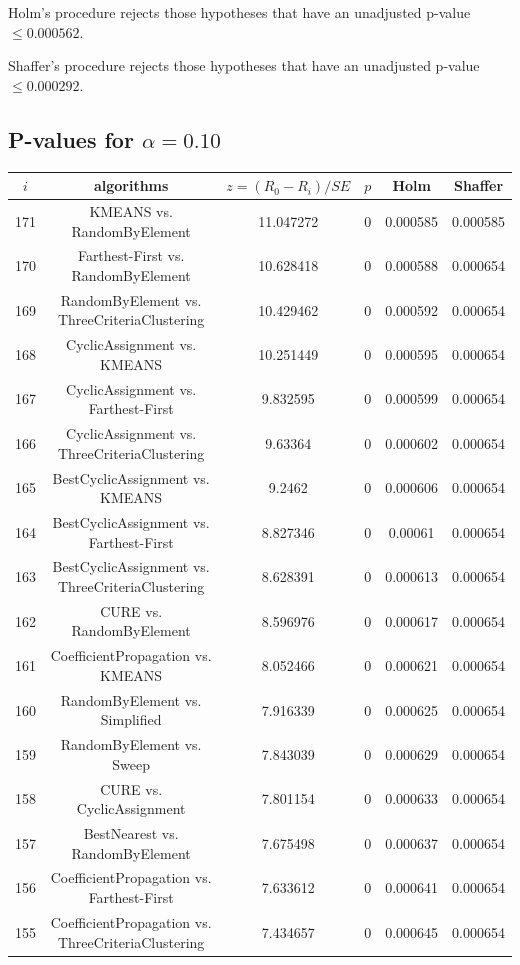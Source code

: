 \documentclass[a4paper,10pt]{article}
\begin{document}
\begin{landscape}
Holm's procedure rejects those hypotheses that have an unadjusted p-value $\le0.000562$.

Shaffer's procedure rejects those hypotheses that have an unadjusted p-value $\le0.000292$.

\pagebreak

\subsection{P-values for $\alpha=0.10$}

\begin{table}[!htp]
\centering\scriptsize
\begin{tabular}{cccccc}
$i$&algorithms&$z=(R_0 - R_i)/SE$&$p$&Holm&Shaffer\\
\hline171&KMEANS vs. RandomByElement&11.047272&0&0.000585&0.000585\\
170&Farthest-First vs. RandomByElement&10.628418&0&0.000588&0.000654\\
169&RandomByElement vs. ThreeCriteriaClustering&10.429462&0&0.000592&0.000654\\
168&CyclicAssignment vs. KMEANS&10.251449&0&0.000595&0.000654\\
167&CyclicAssignment vs. Farthest-First&9.832595&0&0.000599&0.000654\\
166&CyclicAssignment vs. ThreeCriteriaClustering&9.63364&0&0.000602&0.000654\\
165&BestCyclicAssignment vs. KMEANS&9.2462&0&0.000606&0.000654\\
164&BestCyclicAssignment vs. Farthest-First&8.827346&0&0.00061&0.000654\\
163&BestCyclicAssignment vs. ThreeCriteriaClustering&8.628391&0&0.000613&0.000654\\
162&CURE vs. RandomByElement&8.596976&0&0.000617&0.000654\\
161&CoefficientPropagation vs. KMEANS&8.052466&0&0.000621&0.000654\\
160&RandomByElement vs. Simplified&7.916339&0&0.000625&0.000654\\
159&RandomByElement vs. Sweep&7.843039&0&0.000629&0.000654\\
158&CURE vs. CyclicAssignment&7.801154&0&0.000633&0.000654\\
157&BestNearest vs. RandomByElement&7.675498&0&0.000637&0.000654\\
156&CoefficientPropagation vs. Farthest-First&7.633612&0&0.000641&0.000654\\
155&CoefficientPropagation vs. ThreeCriteriaClustering&7.434657&0&0.000645&0.000654\\

\end{tabular}
\end{table}
\end{landscape}
\end{document}
